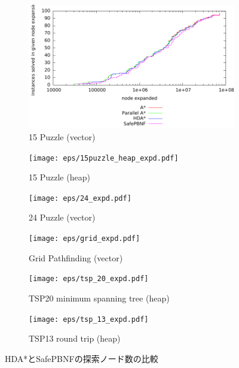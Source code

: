 \documentclass{jsarticle}
\begin{document}
\begin{figure}
	\begin{subfigure}{0.4\columnwidth}
		\includegraphics[width=\columnwidth]{eps/15puzzle_vector_expd.pdf}
		\caption{15 Puzzle (vector)}
		\label{fig:15puzzle_vector_expd}
	\end{subfigure}
	\begin{subfigure}{0.4\columnwidth}
		\texttt{[image: eps/15puzzle\_heap\_expd.pdf]}
		\caption{15 Puzzle (heap)}
		\label{fig:15puzzle_heap_expd}
	\end{subfigure}
	\begin{subfigure}{0.4\columnwidth}
		\texttt{[image: eps/24\_expd.pdf]}
		\caption{24 Puzzle (vector)}
		\label{fig:24puzzle_vector_expd}
	\end{subfigure}
	\begin{subfigure}{0.4\columnwidth}
		\texttt{[image: eps/grid\_expd.pdf]}
		\caption{Grid Pathfinding (vector)}
		\label{fig:grid_expd}
	\end{subfigure}
	\begin{subfigure}{0.4\columnwidth}
		\texttt{[image: eps/tsp\_20\_expd.pdf]}
		\caption{TSP20 minimum spanning tree (heap)}
		\label{fig:tsp_20_mst_expd}
	\end{subfigure}
	\begin{subfigure}{0.4\columnwidth}
		\texttt{[image: eps/tsp\_13\_expd.pdf]}
		\caption{TSP13 round trip (heap)}
		\label{fig:tsp_13_expd}
	\end{subfigure}
	\caption{HDA*とSafePBNFの探索ノード数の比較}
	\label{fig:comparison_expd}
\end{figure}%
\end{document}
